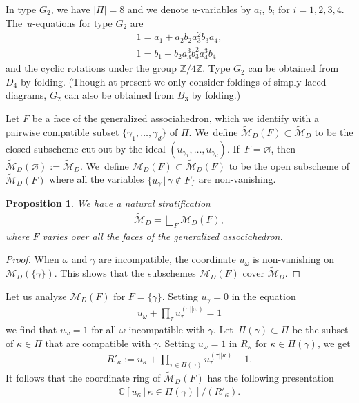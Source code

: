 \documentclass[pdftex]{sigma}%
\def\C{{\mathbb C}}
\def\Z{{\mathbb Z}}
\def\M{{\mathcal{M}}}
\def\tM{{\widetilde {\mathcal{M}}}}
\numberwithin{equation}{section}
\newtheorem{Proposition}[Theorem]{Proposition}
\begin{document}
\medskip{} %
In type $G_2$, we have $|\Pi|=8$ and we denote $u$-variables by $a_i$, $b_i$ for $i =1,2,3,4$. The~$u$-equations for type $G_2$ are
\begin{gather*}
1 = a_1 + a_2 b_2 a^2_3 b_3 a_4, \\
1 = b_1 + b_2 a_3^3 b_3^2 a^3_4 b_4
\end{gather*}
and the cyclic rotations under the group $\Z/4\Z$. Type $G_2$ can be obtained from $D_4$ by folding. (Though at present we only consider foldings of simply-laced diagrams, $G_2$ can also be obtained from $B_3$ by folding.)

\bigskip{}
Let $F$ be a face of the generalized associahedron, which we identify with a pairwise compatible subset $\{\gamma_1,\dots,\gamma_d\}$ of $\Pi$. We~define $\tM_D(F) \subset \tM_D$ to be the closed subscheme cut out by the ideal $(u_{\gamma_1},\dots,u_{\gamma_d})$. If~$F = \varnothing$, then $\tM_D(\varnothing) := \tM_D$. We~define $\M_D(F) \subset \tM_D(F)$ to be the open subscheme of $\tM_D(F)$ where all the variables $\{u_\gamma \,|\, \gamma \notin F\}$ are non-vanishing.

\begin{Proposition}\label{prop:MDstrat}
We have a natural stratification
\begin{gather}\label{eq:Mstrata}
\tM_D = \bigsqcup_{F} \M_D(F),
\end{gather}
where $F$ varies over all the faces of the generalized associahedron.
\end{Proposition}

\begin{proof}
When $\omega$ and $\gamma$ are incompatible, the coordinate $u_\omega$ is non-vanishing on $\M_D(\{\gamma\})$. This shows that the subschemes $\M_D(F)$ cover $\tM_D$.
\end{proof}

\medskip{}
Let us analyze $\tM_D(F)$ for $F = \{\gamma\}$. Setting $u_\gamma = 0$ in the equation
\begin{gather*}
u_\omega + \prod_{\tau} u_{\tau}^{(\tau||\omega)} = 1
\end{gather*}
we find that $u_\omega = 1$ for all $\omega$ incompatible with $\gamma$. Let~$\Pi(\gamma) \subset \Pi$ be the subset of $\kappa \in \Pi$ that are compatible with $\gamma$.
Setting $u_\omega=1$ in $R_\kappa$ for $\kappa \in \Pi(\gamma)$, we get
\begin{gather*}
R'_\kappa := u_\kappa + \prod_{\tau\in \Pi(\gamma)} u_{\tau}^{(\tau||\kappa)} - 1.
\end{gather*}
It follows that the coordinate ring of $\tM_D(F)$ has the following presentation
\begin{gather*}
\C[u_\kappa \,|\, \kappa\in \Pi(\gamma)]/(R'_\kappa).
\end{gather*}
\end{document}
